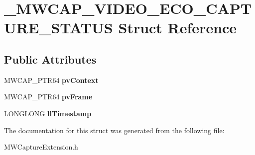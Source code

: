 \hypertarget{struct__MWCAP__VIDEO__ECO__CAPTURE__STATUS}{\section{\-\_\-\-M\-W\-C\-A\-P\-\_\-\-V\-I\-D\-E\-O\-\_\-\-E\-C\-O\-\_\-\-C\-A\-P\-T\-U\-R\-E\-\_\-\-S\-T\-A\-T\-U\-S Struct Reference}
\label{struct__MWCAP__VIDEO__ECO__CAPTURE__STATUS}
}
\subsection*{Public Attributes}
\begin{DoxyCompactItemize}
\item 
\hypertarget{struct__MWCAP__VIDEO__ECO__CAPTURE__STATUS_ac8c2a3a2edb042fc224e8444b5b12933}{M\-W\-C\-A\-P\-\_\-\-P\-T\-R64 {\bfseries pv\-Context}}\label{struct__MWCAP__VIDEO__ECO__CAPTURE__STATUS_ac8c2a3a2edb042fc224e8444b5b12933}

\item 
\hypertarget{struct__MWCAP__VIDEO__ECO__CAPTURE__STATUS_ae357b09aba47dbfb10f13bfa32137cf7}{M\-W\-C\-A\-P\-\_\-\-P\-T\-R64 {\bfseries pv\-Frame}}\label{struct__MWCAP__VIDEO__ECO__CAPTURE__STATUS_ae357b09aba47dbfb10f13bfa32137cf7}

\item 
\hypertarget{struct__MWCAP__VIDEO__ECO__CAPTURE__STATUS_afbb4e57eccc358830cc1f11b46207542}{L\-O\-N\-G\-L\-O\-N\-G {\bfseries ll\-Timestamp}}\label{struct__MWCAP__VIDEO__ECO__CAPTURE__STATUS_afbb4e57eccc358830cc1f11b46207542}

\end{DoxyCompactItemize}


The documentation for this struct was generated from the following file\-:\begin{DoxyCompactItemize}
\item 
M\-W\-Capture\-Extension.\-h\end{DoxyCompactItemize}
